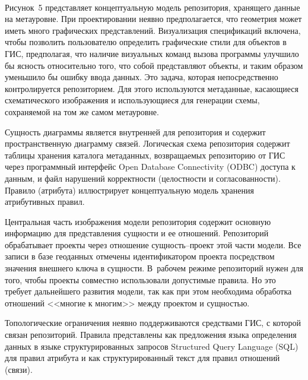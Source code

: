 \begin{multicols}{2}
\begin{figure*} %
 \vspace*{1pt}
 \begin{center}
 \mbox{%
 \epsfxsize=127.755mm
 }
 \end{center}
 \vspace*{-9pt}
\vspace*{6pt}
\end{figure*}

      Рисунок~5 представляет концептуальную модель репозитория, хранящего 
данные на ме\-та\-уров\-не. 
При проектировании неявно предполагается, что геометрия может 
иметь много {графических} представлений. Визуализация спецификаций вклю\-че\-на, чтобы 
позволить пользователю определить графические стили для объектов в ГИС, предполагая, 
что наличие визуальных команд вызова программы улучшило бы ясность относительно 
того, что собой представляют объекты, и таким образом уменьшило бы ошибку ввода 
данных. Это задача, которая непосредственно контролируется репозиторием. Для этого 
используются метаданные, касающиеся схематического изображения и использующиеся 
для генерации схемы, со\-хра\-ня\-емой на том же самом метауровне.
      
      Сущность диаграммы является внутренней для репозитория и содержит 
пространственную диаграмму связей. Логическая схема репозитория содержит таблицы 
хранения каталога метаданных, возвращаемых репозиторию от ГИС через программный 
интерфейс Open Database Connectivity (ODBC) доступа к данным, и файл нарушений 
корректности (целостности и согласованности). Правило (атрибута) иллюстрирует 
концептуальную модель хранения атрибутивных правил. 



      Центральная часть изображения модели репозитория содержит основную 
информацию для представления сущности и ее отношений. Репозиторий обрабатывает 
проекты через отношение сущность--проект этой части модели. Все записи в базе 
геоданных отмечены идентификатором проекта посредством значения внешнего ключа в 
сущности. В~рабочем режиме репозиторий нужен для того, чтобы 
проекты совместно использовали допустимые правила. Но это требует дальнейшего 
развития модели, так как при этом необходима обработка отношений <<многие к многим>> 
между проектом и сущностью. 
      
      Топологические ограничения неявно поддерживаются средствами ГИС, с которой 
связан репозиторий. Правила представлены как предложения языка определения данных в 
языке структурированных запросов Structured Query Language (SQL) для правил атрибута 
и как структурированный текст для правил отношений (связи).



\end{multicols}
